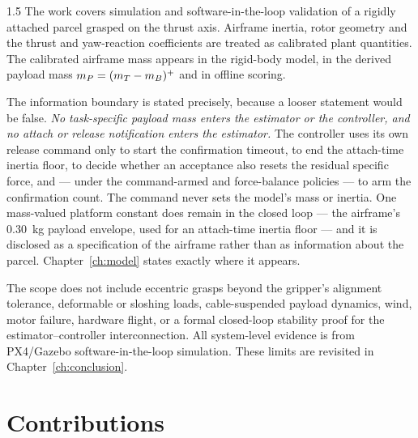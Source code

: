 \begin{spacing}{1.5}
The work covers simulation and software-in-the-loop validation of a rigidly
attached parcel grasped on the thrust axis. Airframe inertia, rotor geometry and
the thrust and
yaw-reaction coefficients are treated as calibrated plant quantities. The
calibrated airframe mass appears in the rigid-body model, in the derived payload
mass $m_P=(m_T-m_B)^{+}$ and in offline scoring.

The information boundary is stated precisely, because a looser statement would be
false. \emph{No task-specific payload mass enters the estimator or the
controller, and no attach or release notification enters the estimator.} The
controller uses its own release command only to start the confirmation timeout,
to end the attach-time inertia floor, to decide whether an acceptance also resets
the residual specific force, and --- under the command-armed and force-balance
policies --- to arm the confirmation count. The command never sets the model's mass or inertia. One mass-valued platform
constant does remain in the closed loop --- the airframe's \SI{0.30}{\kg} payload
envelope, used for an attach-time inertia floor --- and it is disclosed as a
specification of the airframe rather than as
information about the parcel. Chapter~\ref{ch:model} states exactly where it
appears.

The scope does not include eccentric grasps beyond the gripper's alignment
tolerance, deformable or sloshing loads, cable-suspended payload dynamics, wind,
motor failure, hardware flight, or a formal closed-loop stability proof for the estimator--controller
interconnection. All system-level evidence is from PX4/Gazebo
software-in-the-loop simulation. These limits are revisited in
Chapter~\ref{ch:conclusion}.

\section{Contributions}


\end{spacing}
